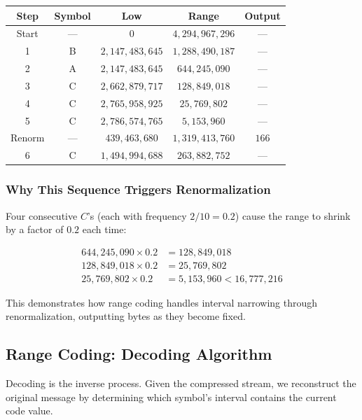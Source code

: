 \documentclass[12pt]{article}
\begin{document}
\begin{center}
\begin{tabular}{c|c|c|c|c}
\hline
\textbf{Step} & \textbf{Symbol} & \textbf{Low} & \textbf{Range} & \textbf{Output} \\ \hline
Start & — & $0$ & $4{,}294{,}967{,}296$ & — \\
1 & B & $2{,}147{,}483{,}645$ & $1{,}288{,}490{,}187$ & — \\
2 & A & $2{,}147{,}483{,}645$ & $644{,}245{,}090$ & — \\
3 & C & $2{,}662{,}879{,}717$ & $128{,}849{,}018$ & — \\
4 & C & $2{,}765{,}958{,}925$ & $25{,}769{,}802$ & — \\
5 & C & $2{,}786{,}574{,}765$ & $5{,}153{,}960$ & — \\
Renorm & — & $439{,}463{,}680$ & $1{,}319{,}413{,}760$ & $166$ \\
6 & C & $1{,}494{,}994{,}688$ & $263{,}882{,}752$ & — \\ \hline
\end{tabular}
\end{center}

\subsubsection*{Why This Sequence Triggers Renormalization}

Four consecutive $C$'s (each with frequency $2/10 = 0.2$) cause the range to shrink by a factor of $0.2$ each time:

\begin{align*}
644{,}245{,}090 \times 0.2 &= 128{,}849{,}018 \\
128{,}849{,}018 \times 0.2 &= 25{,}769{,}802 \\
25{,}769{,}802 \times 0.2 &= 5{,}153{,}960 < 16{,}777{,}216
\end{align*}

This demonstrates how range coding handles interval narrowing through renormalization, outputting bytes as they become fixed.

\subsection{Range Coding: Decoding Algorithm}

Decoding is the inverse process. Given the compressed stream, we reconstruct the original message by determining which symbol's interval contains the current code value.
\end{document}
